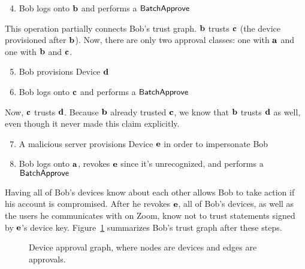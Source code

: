 \begin{enumerate}
  \setcounter{enumi}{3}
\item Bob logs onto $\mathbf{b}$ and performs a $\mathsf{BatchApprove}{}$
\end{enumerate}

This operation partially connects Bob's trust graph. $\mathbf{b}$ trusts $\mathbf{c}$ (the device
provisioned after $\mathbf{b}$). Now, there are only two approval classes: one with $\mathbf{a}$ and one
with $\mathbf{b}$ and $\mathbf{c}$.

\begin{enumerate}
  \setcounter{enumi}{4}
\item Bob provisions Device $\mathbf{d}$
\item Bob logs onto $\mathbf{c}$ and performs a $\mathsf{BatchApprove}{}$
\end{enumerate}

Now, $\mathbf{c}$ trusts $\mathbf{d}$. Because $\mathbf{b}$ already trusted $\mathbf{c}$, we know that
$\mathbf{b}$ trusts $\mathbf{d}$ as well, even though it never made this claim explicitly.

\begin{enumerate}
  \setcounter{enumi}{6}
\item A malicious server provisions Device $\mathbf{e}$ in order to impersonate Bob
\item Bob logs onto $\mathbf{a}$, revokes $\mathbf{e}$ since it's unrecognized, and performs a
    $\mathsf{BatchApprove}{}$
\end{enumerate}

Having all of Bob's devices know about each other allows Bob to take action if his account is
compromised. After he revokes $\mathbf{e}$, all of Bob's devices, as well as the users he communicates
with on Zoom, know not to trust statements signed by $\mathbf{e}$'s device key.
Figure~\ref{fig:devices} summarizes Bob's trust graph after these steps.

\begin{figure}
\centering
{}
\caption{Device approval graph, where nodes are devices and edges are approvals.}
\label{fig:devices}
\end{figure}

